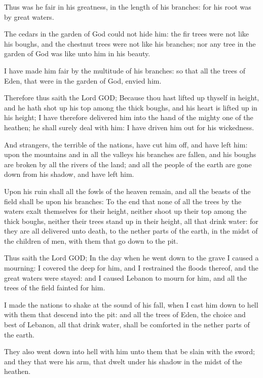 \Verse Thus was he fair in his greatness, in the length of his branches: for his root was by great waters.

\Verse The cedars in the garden of God could not hide him: the fir trees were not like his boughs, and the chestnut trees were not like his branches; nor any tree in the garden of God was like unto him in his beauty.

\Verse I have made him fair by the multitude of his branches: so that all the trees of Eden, that were in the garden of God, envied him.

\Verse Therefore thus saith the Lord GOD; Because thou hast lifted up thyself in height, and he hath shot up his top among the thick boughs, and his heart is lifted up in his height; \Verse I have therefore delivered him into the hand of the mighty one of the heathen; he shall surely deal with him: I have driven him out for his wickedness.

\Verse And strangers, the terrible of the nations, have cut him off, and have left him: upon the mountains and in all the valleys his branches are fallen, and his boughs are broken by all the rivers of the land; and all the people of the earth are gone down from his shadow, and have left him.

\Verse Upon his ruin shall all the fowls of the heaven remain, and all the beasts of the field shall be upon his branches: \Verse To the end that none of all the trees by the waters exalt themselves for their height, neither shoot up their top among the thick boughs, neither their trees stand up in their height, all that drink water: for they are all delivered unto death, to the nether parts of the earth, in the midst of the children of men, with them that go down to the pit.

\Verse Thus saith the Lord GOD; In the day when he went down to the grave I caused a mourning: I covered the deep for him, and I restrained the floods thereof, and the great waters were stayed: and I caused Lebanon to mourn for him, and all the trees of the field fainted for him.

\Verse I made the nations to shake at the sound of his fall, when I cast him down to hell with them that descend into the pit: and all the trees of Eden, the choice and best of Lebanon, all that drink water, shall be comforted in the nether parts of the earth.

\Verse They also went down into hell with him unto them that be slain with the sword; and they that were his arm, that dwelt under his shadow in the midst of the heathen.

